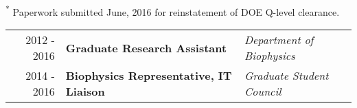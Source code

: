 \begin{center}
\begin{minipage}{\textwidth}
\begin{itemize}
	\end{itemize}
\end{minipage}
    \end{center}

\begin{minipage}{\textwidth}
\begin{center}
\footnotesize \textsuperscript{*} Paperwork submitted June, 2016 for reinstatement of DOE Q-level clearance.
\end{center}
\end{minipage}


\begin{minipage}{\textwidth}
	\begin{tabular}{r|ll}
		2012 - 2016 & \textbf{Graduate Research Assistant} & \textit{Department of Biophysics}  \\
		2014 - 2016 & \textbf{Biophysics Representative, IT Liaison} & \textit{Graduate Student Council}  \\
	\end{tabular}
\end{minipage}

